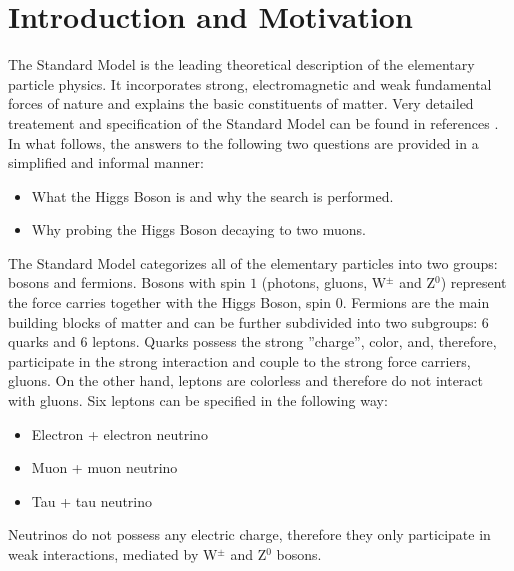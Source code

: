 \section{Introduction and Motivation} \label{section:higgs_introduction}
The Standard Model is the leading theoretical description of the elementary particle physics. It incorporates strong, electromagnetic and weak fundamental forces of nature and explains the basic constituents of matter. Very detailed treatement and specification of the Standard Model can be found in references \cite{Peskin,Griffiths,Nikhef}. In what follows, the answers to the following two questions are provided in a simplified and informal manner:
\begin{itemize}
    \item What the Higgs Boson is and why the search is performed.
    \item Why probing the Higgs Boson decaying to two muons.
\end{itemize}

The Standard Model categorizes all of the elementary particles into two groups: bosons and fermions. Bosons with spin $1$ (photons, gluons, W$^{\pm}$ and Z$^{0}$) represent the force carries together with the Higgs Boson, spin $0$. Fermions are the main building blocks of matter and can be further subdivided into two subgroups: $6$ quarks and $6$ leptons. Quarks possess the strong ''charge'', color, and, therefore, participate in the strong interaction and couple to the strong force carriers, gluons. On the other hand, leptons are colorless and therefore do not interact with gluons. Six leptons can be specified in the following way:
\begin{itemize}
    \item Electron + electron neutrino
    \item Muon + muon neutrino
    \item Tau + tau neutrino
\end{itemize}
Neutrinos do not possess any electric charge, therefore they only participate in weak interactions, mediated by W$^{\pm}$ and Z$^{0}$ bosons.

